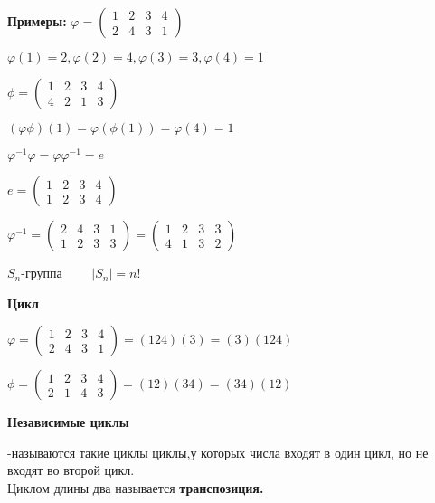 \documentclass[12pt]{article}
\begin{document}
		
		\textbf{Примеры:} $\varphi=\begin{pmatrix}
		1 & 2 & 3 & 4 \\
		2 & 4 & 3 & 1
		\end{pmatrix}$
		
		$ \varphi(1)=2 , \varphi(2)=4, \varphi(3)=3, \varphi(4)=1$
		
		$\phi=\begin{pmatrix}
		1 & 2 & 3 & 4 \\
		4 & 2 & 1 & 3
		\end{pmatrix}$
		
		$(\varphi\phi)(1)=\varphi(\phi(1))=\varphi(4)=1$
		
		$\varphi^{-1}\varphi=\varphi\varphi^{-1}=e$
		
		$e=\begin{pmatrix}
		1 & 2 & 3 & 4 \\
		1 & 2 & 3 & 4
		\end{pmatrix}$
		
		$\varphi^{-1}=\begin{pmatrix}
		2 & 4 & 3 & 1 \\
		1 & 2 & 3 & 3
		\end{pmatrix}=\begin{pmatrix}
		1 & 2 & 3 & 3 \\
		4 & 1 & 3 & 2 
		\end{pmatrix}$
		
		$S_n$-группа  $\qquad |S_n|=n!$
		
		\textbf{Цикл}
		
		$\varphi=\begin{pmatrix}
		1 & 2 & 3 & 4 \\
		2 & 4 & 3 & 1
		\end{pmatrix}=(124)(3)=(3)(124)$
		
		$\phi=\begin{pmatrix}
		1 & 2 & 3 & 4 \\
		2 & 1 & 4 & 3
		\end{pmatrix}=(12)(34)=(34)(12)$
		
		\hypertarget{def:while}{\textbf{Независимые циклы}}-называются такие циклы циклы,у которых числа входят в один цикл, но не входят во второй цикл.\\
		Циклом длины два называется \textbf{транспозиция.}
		
\end{document}
